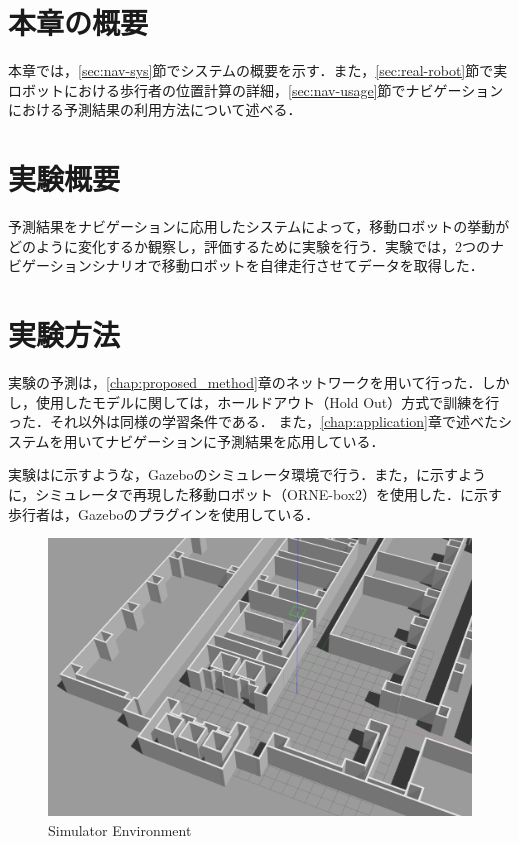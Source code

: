 
\vspace{-10pt}

\section{本章の概要}
本章では，\ref{sec:nav-sys}節でシステムの概要を示す．また，\ref{sec:real-robot}節で実ロボットにおける歩行者の位置計算の詳細，\ref{sec:nav-usage}節でナビゲーションにおける予測結果の利用方法について述べる．

\section{実験概要}
予測結果をナビゲーションに応用したシステムによって，移動ロボットの挙動がどのように変化するか観察し，評価するために実験を行う．実験では，2つのナビゲーションシナリオで移動ロボットを自律走行させてデータを取得した．

\section{実験方法}
実験の予測は，\ref{chap:proposed_method}章のネットワークを用いて行った．しかし，使用したモデルに関しては，ホールドアウト（Hold Out）方式で訓練を行った．それ以外は同様の学習条件である．
また，\ref{chap:application}章で述べたシステムを用いてナビゲーションに予測結果を応用している．

実験はに示すような，Gazebo\cite{Gazebo62:online}のシミュレータ環境で行う．また，に示すように，シミュレータで再現した移動ロボット（ORNE-box2\cite{井口颯人2023屋外自律移動ロボットプラットフォーム-orne}）を使用した．に示す歩行者は，Gazeboのプラグイン\cite{Actors-G87:online}を使用している．

\begin{figure}[H]
  \centering
 \includegraphics[keepaspectratio, scale=0.15]
      {images/sim-env.png}
\caption{Simulator Environment}
 \label{Fig:sim-env}
\end{figure} 

